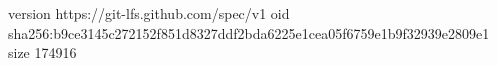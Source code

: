 version https://git-lfs.github.com/spec/v1
oid sha256:b9ce3145c272152f851d8327ddf2bda6225e1cea05f6759e1b9f32939e2809e1
size 174916
